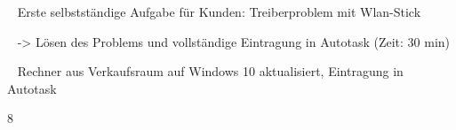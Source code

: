 {{	\textbullet~ Erste selbstständige Aufgabe für Kunden: Treiberproblem mit Wlan-Stick\par
	\textbullet~ -> Lösen des Problems und vollständige Eintragung in Autotask (Zeit: 30 min)\par
	\textbullet~ Rechner aus Verkaufsraum auf Windows 10 aktualisiert, Eintragung in Autotask
	}{}{8}
}{}
\Unterschrift
\newpage
